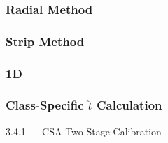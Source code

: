 \subsubsection{Radial Method}

\subsubsection{Strip Method}

\subsubsection{1D}

\subsubsection{Class-Specific \texorpdfstring{$\hat{t}$}{t̂} Calculation}


3.4.1 — CSA Two-Stage Calibration





